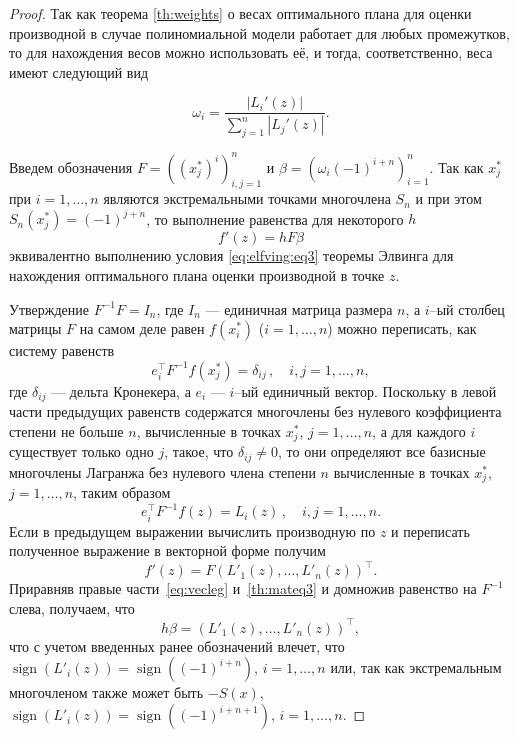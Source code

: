 \documentclass[specialist,
               substylefile = spbu.rtx,
               subf,href,colorlinks=true, 12pt]{disser}
\theoremstyle{definition}
\DeclareMathOperator*{\sign}{sign}
\newcommand\abs[1]{\left\lvert#1\right\rvert}
\begin{document}
\begin{proof}
	Так как теорема \ref{th:weights} о весах оптимального плана для оценки производной в случае полиномиальной модели работает для любых промежутков, то для нахождения весов можно использовать её, и тогда, соответственно, веса имеют следующий вид
	
	\begin{equation*}
		\omega_i = \frac{\abs{L_i'(z)}}{\sum_{j=1}^n \abs{L_j'(z)}}.
	\end{equation*}
	
	Введем обозначения $F = \left((x_j^*)^i\right)^n_{i, j = 1}$ и $\beta = \left( \omega_i (-1)^{i+n} \right)_{i=1}^n$. Так как $x_j^*$ при $i = 1, \ldots , n$ являются экстремальными точками многочлена $S_n$ и при этом $S_n(x_j^*) = (-1)^{j+n}$, то выполнение равенства для некоторого $h$
	\begin{equation}
		\label{th:mateq3}
		f'(z) = hF\beta
	\end{equation}
	 эквивалентно выполнению условия \eqref{eq:elfving:eq3} теоремы Элвинга для нахождения оптимального плана оценки производной в точке $z$.
	 
	Утверждение $F^{-1}F = I_n$, где $I_n$ --- единичная матрица размера $n$, а $i$--ый столбец матрицы $F$ на самом деле равен $f(x_i^*)$ ($i = 1, \ldots, n$) можно переписать, как систему равенств
	\begin{equation*}
		e_i^{\top} F^{-1} f(x_j^*) = \delta_{ij} \, , \quad i, j = 1, \ldots , n ,
	\end{equation*}
	где $\delta_{ij}$ --- дельта Кронекера, а $e_i$ --- $i$--ый единичный вектор. Поскольку в левой части предыдущих равенств содержатся многочлены без нулевого коэффициента степени не больше $n$, вычисленные в точках $x_j^*$, $j=1, \ldots , n$, а для каждого $i$ существует только одно $j$, такое, что $\delta_{ij} \neq 0$, то они определяют все базисные многочлены Лагранжа без нулевого члена степени $n$ вычисленные в точках $x_j^*$, $j=1, \ldots , n$, таким образом
	\begin{equation*}
		e_i^{\top} F^{-1} f(z) = L_i(z) \, , \quad i, j = 1, \ldots , n .
	\end{equation*}
	Если в предыдущем выражении вычислить производную по $z$ и переписать полученное выражение в векторной форме получим
	\begin{equation}
		\label{eq:vecleg}
		f'(z) = F \left( L'_1(z), \ldots, L'_n(z) \right)^\top.
	\end{equation}
	Приравняв правые части~\eqref{eq:vecleg} и~\eqref{th:mateq3} и домножив равенство на $F^{-1}$ слева, получаем, что
	\begin{equation*}
		h \beta = \left( L'_1(z), \ldots, L'_n(z) \right)^\top,
	\end{equation*}
	что с учетом введенных ранее обозначений влечет, что $\sign (L'_i(z)) = \sign((-1)^{i+n}) $, $i = 1, \ldots, n$ или, так как экстремальным многочленом также может быть $-S(x)$,  $\sign (L'_i(z)) = \sign((-1)^{i+n+1}) $, $i = 1, \ldots, n$.
	

\end{proof}
\end{document}
